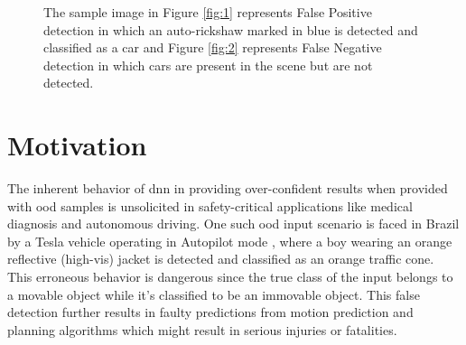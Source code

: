         \begin{figure}[!htbp]
            \centering
          \caption[Sample False Positive and False Negative detections]{The sample image in Figure \ref{fig:1} represents False Positive detection in which an auto-rickshaw marked in blue is detected and classified as a car and Figure \ref{fig:2} represents False Negative detection in which cars are present in the scene but are not detected.}
          \label{fig:3}
        \end{figure}
    
    \section{Motivation}
        The inherent behavior of \acrshort{dnn} in providing over-confident results when provided with \acrshort{ood} samples is unsolicited in safety-critical applications like medical diagnosis and autonomous driving. One such \acrshort{ood} input scenario is faced in Brazil by a Tesla vehicle operating in Autopilot mode \citep{Gustavo2019}, where a boy wearing an orange reflective (high-vis) jacket is detected and classified as an orange traffic cone. This erroneous behavior is dangerous since the true class of the input belongs to a movable object while it's classified to be an immovable object. This false detection further results in faulty predictions from motion prediction and planning algorithms which might result in serious injuries or fatalities.
         
